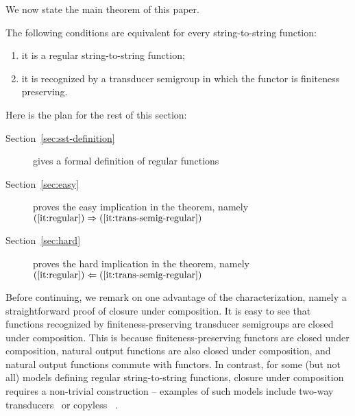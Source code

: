 We now state the main theorem of this paper. 


\begin{theorem}\label{thm:regular-functions}
    The following conditions are equivalent for every string-to-string function:
    \begin{enumerate}
        \item \label{it:regular} it is a regular string-to-string function;
        \item \label{it:trans-semig-regular}it is recognized by a transducer semigroup  in which the functor is finiteness preserving. 
    \end{enumerate}
\end{theorem}

\noindent Here is the plan for the rest of this section:
\begin{description}
    \item[Section~\ref{sec:sst-definition}] gives a formal definition of regular functions
    \item[Section~\ref{sec:easy}] proves the easy  implication in the theorem, namely  $(\ref{it:regular}) \Rightarrow (\ref{it:trans-semig-regular})$
    \item[Section~\ref{sec:hard}] proves the hard  implication in the theorem, namely  $(\ref{it:regular}) \Leftarrow (\ref{it:trans-semig-regular})$
\end{description}

Before continuing, we remark on one advantage of the characterization, namely a straightforward proof of closure under composition. It is easy to see that functions recognized by finiteness-preserving transducer semigroups are closed under composition.  This is because finiteness-preserving functors are closed under composition, natural output functions are also closed under composition, and natural output functions commute with functors.\footnotemark{} In contrast, for some (but not all)  models defining regular string-to-string functions, closure under composition requires a non-trivial construction -- examples of such models include two-way transducers~\cite[Theorem 2]{ChytilJ77} or copyless \sst~\cite[Theorem 1]{composingSST}. 

